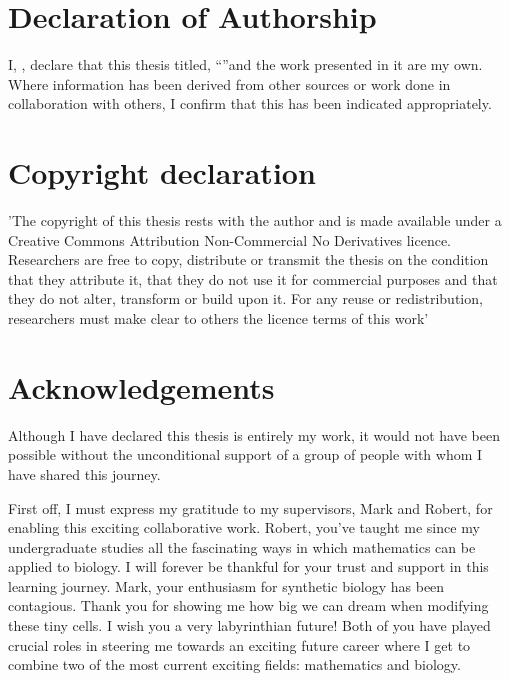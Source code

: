 \documentclass[
    11pt,
    oneside, %
    english,
    onehalfspacing, %
    parskip, %
]{PhDDoctoralThesis}
\begin{document}
    \chapter*{Declaration of Authorship}
    \addchaptertocentry{\authorshipname} %

    \noindent I, \authorname, declare that this thesis titled, \enquote{\ttitle}and the work presented in it are my own.
    Where information has been derived from other sources or work done in collaboration with others,
    I confirm that this has been indicated appropriately.

    \chapter*{Copyright declaration}
    \addchaptertocentry{\copyrightname} %

    'The copyright of this thesis rests with the author and is made available under a Creative
    Commons Attribution Non-Commercial No Derivatives licence. Researchers are free to copy,
    distribute or transmit the thesis on the condition that they attribute it, that they do not use
    it for commercial purposes and that they do not alter, transform or build upon it. For any
    reuse or redistribution, researchers must make clear to others the licence terms of this
    work'


    \chapter*{Acknowledgements}
    \addchaptertocentry{\acknowledgementname}
    Although I have declared this thesis is entirely my work, it would not have been possible without the unconditional support of a group of people with whom I have shared this journey.

    First off, I must express my gratitude to my supervisors, Mark and Robert, for enabling this exciting collaborative work.
    Robert, you've taught me since my undergraduate studies all the fascinating ways in which mathematics can be applied to biology.
    I will forever be thankful for your trust and support in this learning journey.
    Mark, your enthusiasm for synthetic biology has been contagious.
    Thank you for showing me how big we can dream when modifying these tiny cells.
    I wish you a very labyrinthian future!
    Both of you have played crucial roles in steering me towards an exciting future career where I get to combine two of the most current exciting fields: mathematics and biology.
\end{document}
